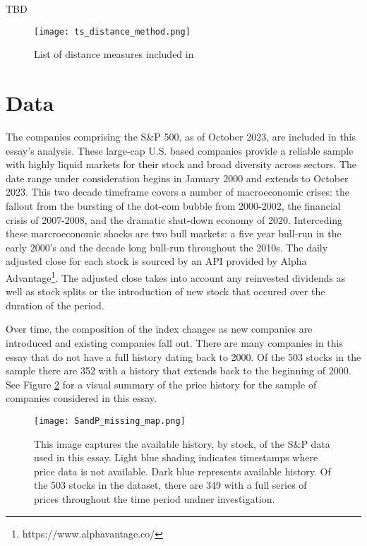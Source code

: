 \documentclass[12pt]{article}
\begin{document}
\parencite{WangXieHanSun2012} TBD

\begin{figure}[ht]
    \centering
    \texttt{[image: ts\_distance\_method.png]}
    \caption{List of distance measures included in \cite{ElsingAgon2012}}
    \label{fig:ds_dist_meas_table}
\end{figure}

\section{Data}

The companies comprising the S\&P 500, as of October 2023, are included in this essay's analysis. These large-cap U.S. based companies provide a reliable sample with highly liquid markets for their stock and broad diversity across sectors. The date range under consideration begins in January 2000 and extends to October 2023. This two decade timeframe covers a number of macroeconomic crises: the fallout from the bursting of the dot-com bubble from 2000-2002, the financial crisis of 2007-2008, and the dramatic shut-down economy of 2020. Interceding these marcroeconomic shocks are two bull markets: a five year bull-run in the early 2000's and the decade long bull-run throughout the 2010s. The daily adjusted close for each stock is sourced by an API provided by Alpha Advantage\footnote{https://www.alphavantage.co/}. The adjusted close takes into account any reinvested dividends as well as stock splits or the introduction of new stock that occured over the duration of the period.

Over time, the composition of the index changes as new companies are introduced and existing companies fall out. There are many companies in this essay that do not have a full history dating back to 2000. Of the 503 stocks in the sample there are 352 with a history that extends back to the beginning of 2000. See Figure \ref{fig:SandP_missing_map} for a visual summary of the price history for the sample of companies considered in this essay.

\begin{figure}
    \centering
    \texttt{[image: SandP\_missing\_map.png]}
    \caption{This image captures the available history, by stock, of the S\&P data used in this essay. Light blue shading indicates timestamps where price data is not available. Dark blue represents available history. Of the 503 stocks in the dataset, there are 349 with a full series of prices throughout the time period undner investigation.}
    \label{fig:SandP_missing_map}
\end{figure}
\end{document}
